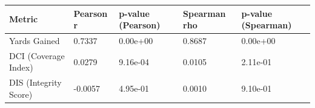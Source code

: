 \begin{tabular}{lllll}
\toprule
Metric & Pearson r & p-value (Pearson) & Spearman rho & p-value (Spearman) \\
\midrule
Yards Gained & 0.7337 & 0.00e+00 & 0.8687 & 0.00e+00 \\
DCI (Coverage Index) & 0.0279 & 9.16e-04 & 0.0105 & 2.11e-01 \\
DIS (Integrity Score) & -0.0057 & 4.95e-01 & 0.0010 & 9.10e-01 \\
\bottomrule
\end{tabular}
